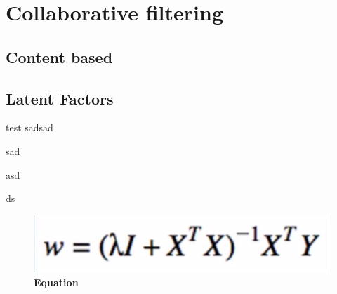 \section{Collaborative filtering}
\cite{RecommenderSystems:2}
\subsection{Content based}
\subsection{Latent Factors}
test
sadsad

sad

asd

ds
\begin{figure}[ht]
\centering
\includegraphics[width=0.7\linewidth]{images/equation01}
\caption{\bfseries Equation}
\label{fig:equation02}
\end{figure}